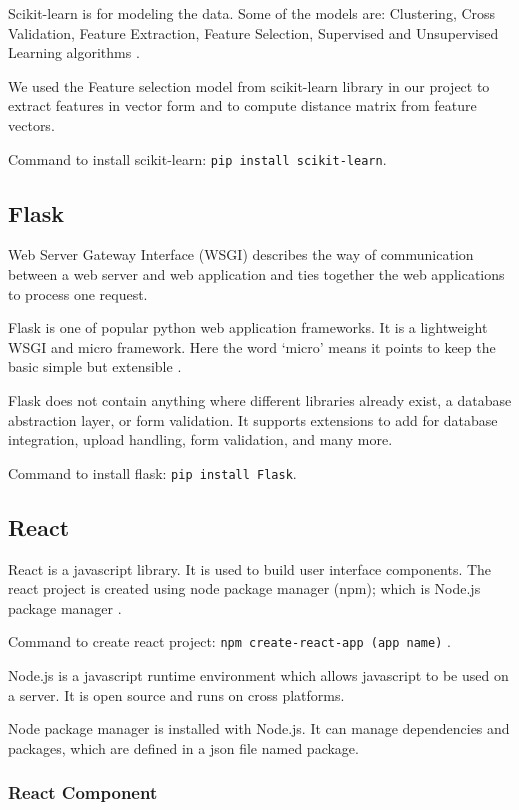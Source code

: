 Scikit-learn is for modeling the data. Some of the models are: Clustering, Cross Validation, Feature Extraction, Feature Selection, Supervised and Unsupervised Learning algorithms \cite{sk-learn}.

We used the Feature selection model from scikit-learn library in our project to extract features in vector form and to compute distance matrix from feature vectors.

Command to install scikit-learn: \texttt{pip install scikit-learn}.

\subsection{Flask}

Web Server Gateway Interface (WSGI) describes the way of communication between a web server and web application and ties together the web applications to process one request.

Flask is one of popular python web application frameworks. It is a lightweight WSGI and micro framework. Here the word ‘micro’ means it points to keep the basic simple but extensible \cite{flask}.

Flask does not contain anything where different libraries already exist, a database abstraction layer, or form validation. It supports extensions to add for database integration, upload handling, form validation, and many more.

Command to install flask: \texttt{pip install Flask}.

\subsection{React}

React is a javascript library. It is used to build user interface components. The react project is created using node package manager (npm); which is Node.js package manager \cite{react-doc}. 

Command to create react project: \texttt{npm create-react-app (app name)} \cite{react-doc}.

Node.js is a javascript runtime environment which allows javascript to be used on a server. It is open source and runs on cross platforms.

Node package manager is installed with Node.js. It can manage dependencies and packages, which are defined in a json file named package.


\subsubsection{React Component}


